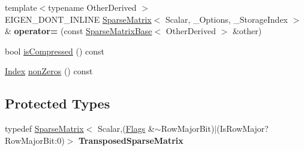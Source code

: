 \begin{DoxyCompactItemize}
\mbox{\label{class_eigen_1_1_sparse_matrix_af3644eddc55de4d85b79b79be0cfafa6}} 
{\footnotesize template$<$typename Other\+Derived $>$ }\\E\+I\+G\+E\+N\+\_\+\+D\+O\+N\+T\+\_\+\+I\+N\+L\+I\+NE \mbox{\hyperlink{class_eigen_1_1_sparse_matrix}{Sparse\+Matrix}}$<$ Scalar, \+\_\+\+Options, \+\_\+\+Storage\+Index $>$ \& {\bfseries operator=} (const \mbox{\hyperlink{class_eigen_1_1_sparse_matrix_base}{Sparse\+Matrix\+Base}}$<$ Other\+Derived $>$ \&other)
\item 
bool \mbox{\hyperlink{class_eigen_1_1_sparse_matrix_a837934b33a80fe996ff20500373d3a61}{is\+Compressed}} () const
\item 
\mbox{\hyperlink{struct_eigen_1_1_eigen_base_a554f30542cc2316add4b1ea0a492ff02}{Index}} \mbox{\hyperlink{class_eigen_1_1_sparse_matrix_a03de8b3da2c142ce8698a76123b3e7d3}{non\+Zeros}} () const
\end{DoxyCompactItemize}
\subsection*{Protected Types}
\begin{DoxyCompactItemize}
\item 
\mbox{\label{class_eigen_1_1_sparse_matrix_a7400e37d81945f5a3a8941fba9ecf193}} 
typedef \mbox{\hyperlink{class_eigen_1_1_sparse_matrix}{Sparse\+Matrix}}$<$ Scalar,(\mbox{\hyperlink{class_eigen_1_1_sparse_matrix_base_a11b30ed44f64a137b4fa1ee638ca2d36a2af043b36fe9e08df0107cf6de496165}{Flags}} \&$\sim$Row\+Major\+Bit)$\vert$(Is\+Row\+Major?Row\+Major\+Bit\+:0)$>$ {\bfseries Transposed\+Sparse\+Matrix}
\end{DoxyCompactItemize}
